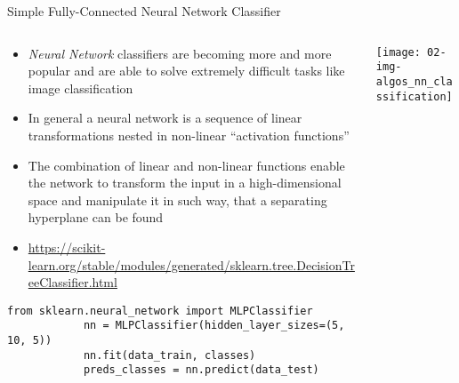   \begin{frame}[fragile]{Simple Fully-Connected Neural Network Classifier}
    \begin{columns}
      \begin{column}{0.65\textwidth}
        \begin{itemize}
          \item \emph{Neural Network} classifiers are becoming more and more popular and are able to solve extremely difficult tasks like image classification
          \item In general a neural network is a sequence of linear transformations nested in non-linear \enquote{activation functions}
          \item The combination of linear and non-linear functions enable the network to transform the input in a high-dimensional space and manipulate it in such way, that a separating hyperplane can be found
          \item \small\url{https://scikit-learn.org/stable/modules/generated/sklearn.tree.DecisionTreeClassifier.html}
        \end{itemize}
        \vspace{-0.5em}
        \begin{mdframed}
          \begin{lstlisting}[style=dark, gobble=10, title=\lsttitlelight{Neural Network classification [Note: example shortened]}]
            from sklearn.neural_network import MLPClassifier
            nn = MLPClassifier(hidden_layer_sizes=(5, 10, 5))
            nn.fit(data_train, classes)
            preds_classes = nn.predict(data_test)
          \end{lstlisting}
        \end{mdframed}
      \end{column}
      \begin{column}{0.35\textwidth}
        \vspace{1em}

        \texttt{[image: 02-img-algos\_nn\_classification]}
      \end{column}
    \end{columns}
  \end{frame}

